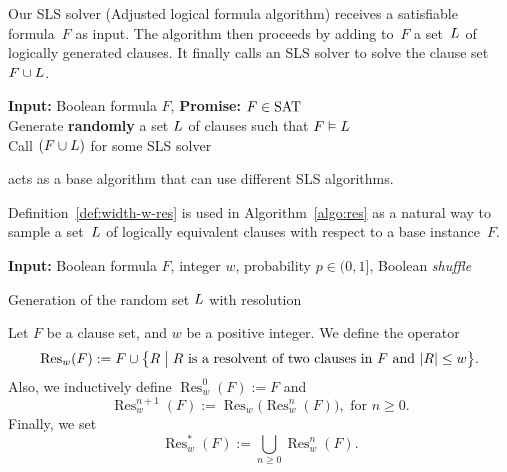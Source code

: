
Our SLS solver \Alfa{} (Adjusted logical formula algorithm) receives a satisfiable formula~$F$ as input.
The algorithm then proceeds by adding to~$F$ a set~$L$ of logically generated clauses.
It finally calls an SLS solver to solve the clause set~$F \cup L$.


\begin{algorithm}[htb]
	\textbf{Input:} Boolean formula $F$, \textbf{Promise:} $F \in \textrm{SAT}$\\
	\BlankLine
	Generate \textbf{randomly} a set $L$ of clauses such that $F \vDash L$\\
	Call $(F \cup L)$ for some SLS solver~
	\caption{\Alfa{} acts as a base algorithm that can use different SLS algorithms.}
	\label{algo:main}
\end{algorithm}



Definition~\ref{def:width-w-res} is used
in Algorithm~\ref{algo:res} as a natural way to sample a set~$L$ of logically equivalent clauses with respect to a base instance~$F$.

\begin{algorithm}[htb]
	
	
	\textbf{Input:} Boolean formula $F$, integer $w$, probability $p \in (0,1]$, Boolean \textit{shuffle}\\
	\BlankLine
	
	
	
	\caption{Generation of the random set $L$ with resolution}
	\label{algo:res}
\end{algorithm}


\begin{definition}
	\label{def:width-w-res}
	Let $F$ be a clause set, and $w$ be a positive integer. We define the operator
	\[
	\operatorname{Res}_w(F) := F \cup \big\{  R \bigm\vert R \text{ is a resolvent of two clauses in } F \text{ and } |R| \leq w  \big\}.
	\]
	Also, we inductively define $\operatorname{Res}_w^{0}(F) := F$ and
	\[
	\operatorname{Res}_w^{n+1}(F) := \operatorname{Res}_w \! \big( \operatorname{Res}_w^{n}(F) \big), \text{ for } n \geq 0.
	\]
	Finally, we set	
	\[
	\operatorname{Res}_w^{\ast}(F) := \bigcup_{n \geq 0} \operatorname{Res}_w^{n}(F).
	\]
\end{definition}



